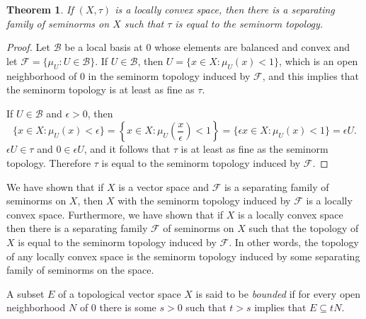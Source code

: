 \documentclass{article}
\newtheorem{theorem}{Theorem}
\begin{document}
\begin{theorem}
If $(X,\tau)$ is a locally convex space, then there is a separating family of seminorms on $X$ such that $\tau$ is equal to the seminorm topology.
\end{theorem}
\begin{proof}
Let $\mathscr{B}$ be a local basis at $0$ whose elements are balanced and convex and let $\mathscr{F} = \{\mu_U: U \in \mathscr{B}\}$. If $U \in \mathscr{B}$, then 
$U=\{x \in X: \mu_U(x)<1\}$, which is an open neighborhood of $0$ in the seminorm topology induced by $\mathscr{F}$, and this implies
that the seminorm topology is at least as fine as $\tau$. 

If $U \in \mathscr{B}$ and $\epsilon>0$, then
\[
\{x \in X:\mu_U(x)<\epsilon\} = \left\{x \in X: \mu_U\left(\frac{x}{\epsilon}\right)<1\right\}=\{\epsilon x \in X: \mu_U(x)<1\}=\epsilon U.
\]
$\epsilon U \in \tau$ and $0 \in \epsilon U$, and it follows that $\tau$ is at least as fine as the seminorm topology. Therefore $\tau$ is equal to the seminorm topology
induced by $\mathscr{F}$. 
\end{proof}

We have shown that if $X$ is a vector space and $\mathscr{F}$ is a separating family of seminorms on $X$, then $X$ with the seminorm topology induced by $\mathscr{F}$
 is a locally convex space. Furthermore, we have shown that if $X$ is a locally convex space then there is a separating family $\mathscr{F}$ of seminorms on $X$ such that
the topology of $X$ is equal to the seminorm topology induced by $\mathscr{F}$. In other words, the topology of any locally convex space is the seminorm topology induced by some
separating family of seminorms on the space.


A subset $E$ of a topological vector space $X$ is said to be {\em bounded} if for every open neighborhood $N$ of $0$ there is some $s>0$
such that $t>s$ implies that $E \subseteq tN$. 
\end{document}
